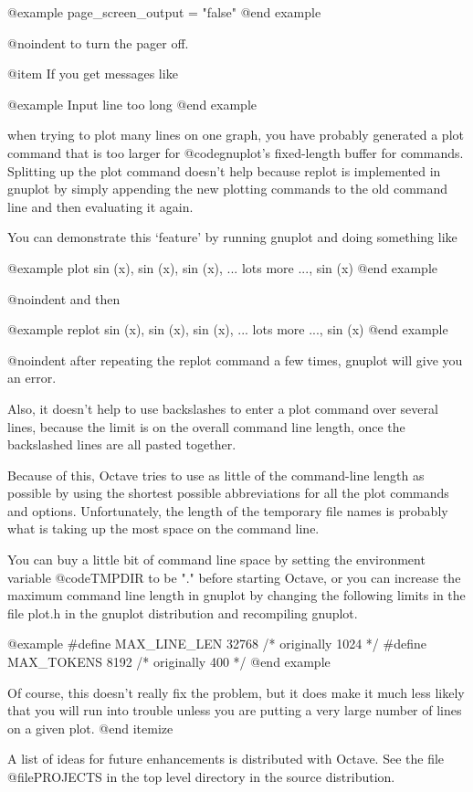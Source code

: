 @example
page_screen_output = "false"
@end example

@noindent
to turn the pager off.

@item
If you get messages like

@example
Input line too long
@end example

when trying to plot many lines on one graph, you have probably generated
a plot command that is too larger for @code{gnuplot}'s fixed-length
buffer for commands.  Splitting up the plot command doesn't help because
replot is implemented in gnuplot by simply appending the new plotting
commands to the old command line and then evaluating it again.

You can demonstrate this `feature' by running gnuplot and doing
something like

@example
  plot sin (x), sin (x), sin (x), ... lots more ..., sin (x)
@end example

@noindent
and then

@example
  replot sin (x), sin (x), sin (x), ... lots more ..., sin (x)
@end example

@noindent
after repeating the replot command a few times, gnuplot will give you
an error.

Also, it doesn't help to use backslashes to enter a plot command over
several lines, because the limit is on the overall command line
length, once the backslashed lines are all pasted together.

Because of this, Octave tries to use as little of the command-line
length as possible by using the shortest possible abbreviations for
all the plot commands and options.  Unfortunately, the length of the
temporary file names is probably what is taking up the most space on
the command line.

You can buy a little bit of command line space by setting the
environment variable @code{TMPDIR} to be "." before starting Octave, or
you can increase the maximum command line length in gnuplot by changing
the following limits in the file plot.h in the gnuplot distribution and
recompiling gnuplot.

@example
#define MAX_LINE_LEN 32768  /* originally 1024 */
#define MAX_TOKENS 8192     /* originally 400 */
@end example  

Of course, this doesn't really fix the problem, but it does make it
much less likely that you will run into trouble unless you are putting
a very large number of lines on a given plot.
@end itemize

A list of ideas for future enhancements is distributed with Octave.  See
the file @file{PROJECTS} in the top level directory in the source
distribution.

